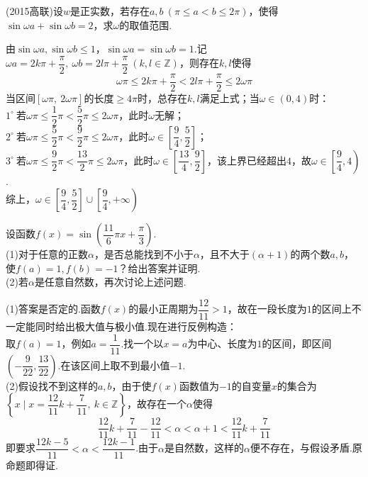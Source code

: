 \documentclass[cn,hazy,black,10pt,normal]{elegantnote}
\newcommand{\ssb}[1]{\left( #1 \right)}
\newcommand{\buzhou}[1]{$#1^{\circ} \ $}
\begin{document}
\begin{problem} %
	(2015高联)设$w$是正实数，若存在$a,b~(\pi \leq a < b \leq 2\pi )$，使得$\sin \omega a + \sin \omega b = 2$，求$\omega$的取值范围.
\end{problem}
\begin{solution}
	由$\sin \omega a , \sin \omega b \leq 1$，$\sin \omega a = \sin \omega b = 1$.记$\omega a = 2k\pi + \dfrac{\pi }{2} ,~\omega b = 2l\pi + \dfrac{\pi }{2}~(k,l \in \mathbb{Z})$，则存在$k,l$使得$$\omega \pi \leq 2k\pi + \frac{\pi }{2} < 2l\pi + \frac{\pi }{2} \leq 2\omega \pi$$
	当区间$[\omega \pi ,~2\omega \pi ]$的长度$\geq 4\pi $时，总存在$k,l$满足上式；当$\omega \in (0,4)$时： \\
	\buzhou{1}若$\omega \pi \leq \dfrac{1}{2}\pi < \dfrac{5}{2}\pi \leq 2\omega \pi$，此时$\omega$无解； \\
	\buzhou{2}若$\omega \pi \leq \dfrac{5}{2}\pi < \dfrac{9}{2}\pi \leq 2\omega \pi$，此时$\omega \in \left[ \dfrac{9}{4},\dfrac{5}{2} \right]$； \\
	\buzhou{3}若$\omega \pi \leq \dfrac{9}{2}\pi < \dfrac{13}{2}\pi \leq 2\omega \pi$，此时$\omega \in \left[ \dfrac{13}{4},\dfrac{9}{2} \right]$，该上界已经超出$4$，故$\omega \in \left[ \dfrac{9}{4},4 \right)$. \\
	综上，$\omega \in \left[ \dfrac{9}{4},\dfrac{5}{2} \right] \cup \left[ \dfrac{9}{4},+\infty \right)$
\end{solution}

\begin{problem} %
	设函数$f(x)=\sin \ssb{\dfrac{11}{6} \pi x + \dfrac{\pi}{3}}$. \\
	(1)对于任意的正数$\alpha$，是否总能找到不小于$\alpha$，且不大于$(\alpha +1)$的两个数$a,b$，使$f(a)=1,f(b)=-1$？给出答案并证明. \\
	(2)若$\alpha$是任意自然数，再次讨论上述问题.
\end{problem}
\begin{solution}
	(1)答案是否定的.函数$f(x)$的最小正周期为$\dfrac{12}{11}>1$，故在一段长度为$1$的区间上不一定能同时给出极大值与极小值.现在进行反例构造： \\
	取$f(a)=1$，例如$a=\dfrac{1}{11}$.找一个以$x=a$为中心、长度为$1$的区间，即区间$\ssb{-\dfrac{9}{22},\dfrac{13}{22}}$.在该区间上取不到最小值$-1$. \\
	(2)假设找不到这样的$a,b$，由于使$f(x)$函数值为$-1$的自变量$x$的集合为$\left\{ x \mid x=\dfrac{12}{11}k+\dfrac{7}{11},~k \in \mathbb{Z} \right\}$，故存在一个$\alpha$使得$$\dfrac{12}{11}k+\dfrac{7}{11}-\dfrac{12}{11} < \alpha < \alpha + 1 < \dfrac{12}{11}k+\dfrac{7}{11}$$
	即要求$\dfrac{12k-5}{11} < \alpha < \dfrac{12k-1}{11}$.由于$\alpha$是自然数，这样的$\alpha$便不存在，与假设矛盾.原命题即得证.
\end{solution}
\end{document}
